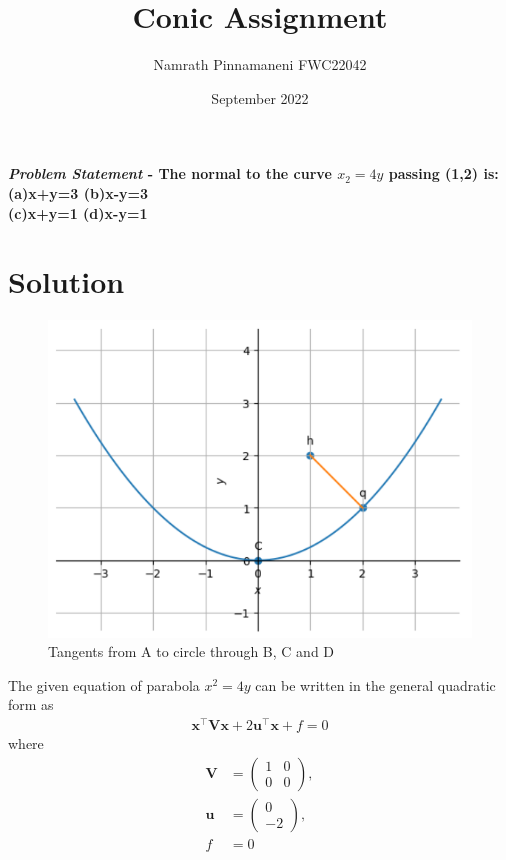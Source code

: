 \documentclass[journal,10pt,twocolumn]{article}
\title{\textbf{Conic Assignment}}
\author{Namrath Pinnamaneni \hspace{9cm} FWC22042}
\date{September 2022}
\let\vec\mathbf
\newcommand{\myvec}[1]{\ensuremath{\begin{pmatrix}#1\end{pmatrix}}}
\begin{document}
\maketitle
\paragraph{\textit{Problem Statement} - The normal to the curve \(x_2=4y\) passing (1,2) is:\\
(a)x+y=3  \hspace{2cm} (b)x-y=3\\ 
(c)x+y=1 \hspace{2cm}  (d)x-y=1\\}

\section*{\large Solution}

\begin{figure}[H]
\centering
\includegraphics[width=1\columnwidth]{conic.png}
\caption{Tangents from A to circle through B, C and D}
\label{fig:triangle}
\end{figure}

The given equation of parabola $x^2 = 4y$ can be written in the general quadratic form as
\begin{align}
    \label{eq:conic_quad_form}
    \vec{x}^{\top}\vec{V}\vec{x}+2\vec{u}^{\top}\vec{x}+f=0
    \end{align}
where
\begin{align}
	\label{eq:V_matrix}
	\vec{V} &= \myvec{1 & 0\\0 & 0},
	\\
	\label{eq:u_vector}
	\vec{u} &= \myvec{0\\-2},
	\\
	\label{eq:f_value}
	f &= 0
\end{align}
\end{document}
